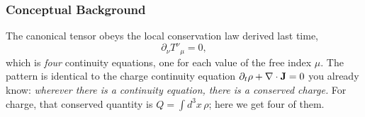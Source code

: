 \subsubsection*{Conceptual Background}
The canonical tensor obeys the local conservation law derived last time,
\begin{equation}\label{eq:lec23:continuity}
  \partial_\nu T^{\nu}{}_{\mu}=0 ,
\end{equation}
which is \emph{four} continuity equations, one for each value of the free index $\mu$.
The pattern is identical to the charge continuity equation $\partial_t\rho+\nabla \cdot\mathbf{J}=0$
you already know: \emph{wherever there is a continuity equation, there is a conserved
charge.} For charge, that conserved quantity is $Q=\int d^3x\,\rho$; here we get four of
them.



